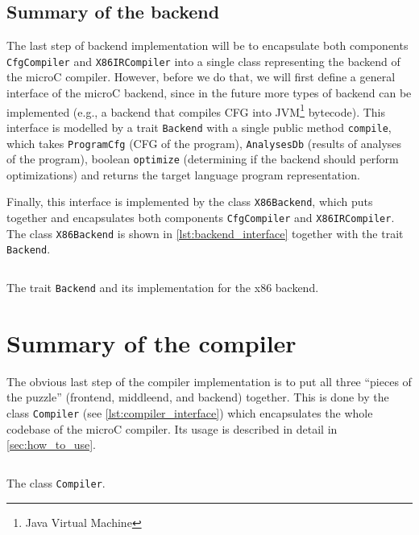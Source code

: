 \documentclass[thesis=M,english]{FITthesis}[2019/12/23]
\begin{document}
\subsection{Summary of the backend}
The last step of backend implementation will be to encapsulate both components \texttt{CfgCompiler} and \texttt{X86IRCompiler} into a single class representing the backend of the microC compiler. However, before we do that, we will first define a general interface of the microC backend, since in the future more types of backend can be implemented (e.g., a backend that compiles CFG into JVM\footnote{Java Virtual Machine} bytecode). This interface is modelled by a trait \texttt{Backend} with a single public method \texttt{compile}, which takes \texttt{ProgramCfg} (CFG of the program), \texttt{AnalysesDb} (results of analyses of the program), boolean \texttt{optimize} (determining if the backend should perform optimizations) and returns the target language program representation.

Finally, this interface is implemented by the class \texttt{X86Backend}, which puts together and encapsulates both components \texttt{CfgCompiler} and \texttt{X86IRCompiler}. The class \texttt{X86Backend} is shown in \autoref{lst:backend_interface} together with the trait \texttt{Backend}.

\begin{listing}[H]
	\inputminted[tabsize=2,breaklines,bgcolor=codebg]{scala}{snippets/backend_interface.m}
	\caption{The trait \texttt{Backend} and its implementation for the x86 backend.}
	\label{lst:backend_interface}
\end{listing}

\section{Summary of the compiler}
The obvious last step of the compiler implementation is to put all three “pieces of the puzzle” (frontend, middleend, and backend) together. This is done by the class \texttt{Compiler} (see \autoref{lst:compiler_interface}) which encapsulates the whole codebase of the microC compiler. Its usage is described in detail in \autoref{sec:how_to_use}.

\begin{listing}[H]
	\inputminted[tabsize=2,breaklines,bgcolor=codebg]{scala}{snippets/compiler_interface.m}
	\caption{The class \texttt{Compiler}.}
	\label{lst:compiler_interface}
\end{listing}
\end{document}
